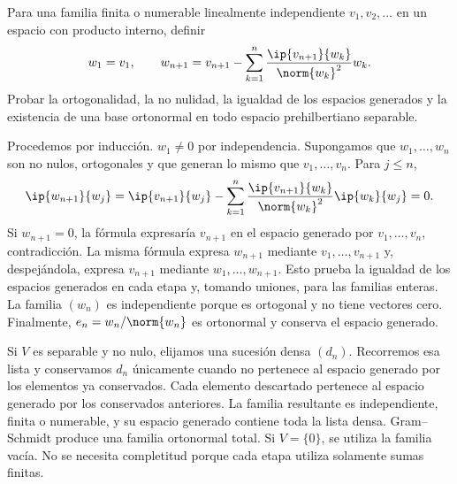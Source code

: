 \begin{ejercicio}
Para una familia finita o numerable linealmente independiente $v_1,v_2,\dots$ en un espacio con producto interno, definir
\[
 w_1=v_1,\qquad
 w_{n+1}=v_{n+1}-\sum_{k=1}^{n}\frac{\ip{v_{n+1}}{w_k}}{\norm{w_k}^{2}}w_k.
\]
Probar la ortogonalidad, la no nulidad, la igualdad de los espacios generados y la existencia de una base ortonormal en todo espacio prehilbertiano separable.
\end{ejercicio}
\begin{solucion}
Procedemos por inducción. $w_1\ne0$ por independencia. Supongamos que $w_1,\dots,w_n$ son no nulos, ortogonales y que generan lo mismo que $v_1,\dots,v_n$. Para $j\leq n$,
\[
 \ip{w_{n+1}}{w_j}
 =\ip{v_{n+1}}{w_j}
 -\sum_{k=1}^{n}\frac{\ip{v_{n+1}}{w_k}}{\norm{w_k}^{2}}\ip{w_k}{w_j}=0.
\]
Si $w_{n+1}=0$, la fórmula expresaría $v_{n+1}$ en el espacio generado por $v_1,\dots,v_n$, contradicción. La misma fórmula expresa $w_{n+1}$ mediante $v_1,\dots,v_{n+1}$ y, despejándola, expresa $v_{n+1}$ mediante $w_1,\dots,w_{n+1}$. Esto prueba la igualdad de los espacios generados en cada etapa y, tomando uniones, para las familias enteras. La familia $(w_n)$ es independiente porque es ortogonal y no tiene vectores cero. Finalmente, $e_n=w_n/\norm{w_n}$ es ortonormal y conserva el espacio generado.

Si $V$ es separable y no nulo, elijamos una sucesión densa $(d_n)$. Recorremos esa lista y conservamos $d_n$ únicamente cuando no pertenece al espacio generado por los elementos ya conservados. Cada elemento descartado pertenece al espacio generado por los conservados anteriores. La familia resultante es independiente, finita o numerable, y su espacio generado contiene toda la lista densa. Gram--Schmidt produce una familia ortonormal total. Si $V=\{0\}$, se utiliza la familia vacía. No se necesita completitud porque cada etapa utiliza solamente sumas finitas.
\end{solucion}

